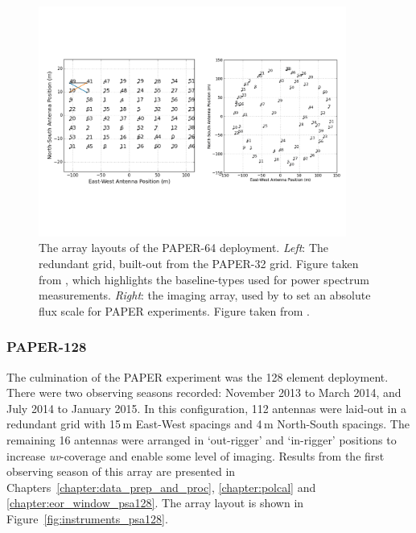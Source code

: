 \begin{figure}
\centering
\includegraphics[width=0.9\textwidth]{chapters/instruments/figures/psa64_layouts.pdf}
\caption[The array layouts of the PAPER-64 deployment.]{The array layouts of the PAPER-64 deployment. \textit{Left}: The redundant grid, built-out from the PAPER-32 grid. Figure taken from \cite{Ali.15}, which highlights the baseline-types used for power spectrum measurements. \textit{Right}: the imaging array, used by \cite{Jacobs.13} to set an absolute flux scale for PAPER experiments. Figure taken from \cite{Jacobs.13}.}
\label{fig:instruments_psa64layout}
\end{figure}

\subsubsection{PAPER-128}

The culmination of the PAPER experiment was the 128 element deployment. There were two observing seasons recorded: November 2013 to March 2014, and July 2014 to January 2015. In this configuration, 112 antennas were laid-out in a redundant grid with 15\,m East-West spacings and 4\,m North-South spacings. The remaining 16 antennas were arranged in `out-rigger' and `in-rigger' positions to increase \textit{uv}-coverage and enable some level of imaging. Results from the first observing season of this array are presented in Chapters~\ref{chapter:data_prep_and_proc}, \ref{chapter:polcal} and \ref{chapter:eor_window_psa128}. The array layout is shown in Figure~\ref{fig:instruments_psa128}.

